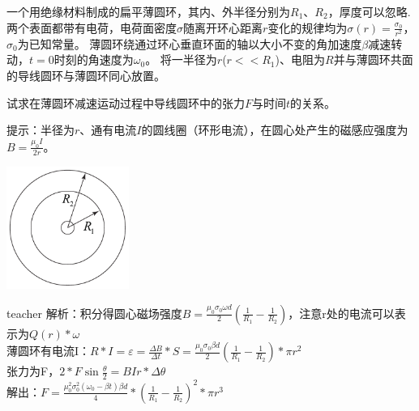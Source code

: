 \begin{example}
一个用绝缘材料制成的扁平薄圆环，其内、外半径分别为$R_1$、$R_2$，厚度可以忽略.
两个表面都带有电荷，电荷面密度$\sigma$随离开环心距离$r$变化的规律均为$ \sigma(r) = \frac{\sigma_0}{r^2}$，$\sigma_0$为已知常量。
薄圆环绕通过环心垂直环面的轴以大小不变的角加速度$\beta$减速转动，$t = 0$时刻的角速度为$\omega_0$。
将一半径为$r$($r<<R_1$)、电阻为$R$并与薄圆环共面的导线圆环与薄圆环同心放置。

试求在薄圆环减速运动过程中导线圆环中的张力$F$与时间$t$的关系。

提示：半径为$r$、通有电流$I$的圆线圈（环形电流），在圆心处产生的磁感应强度为$B = \frac{\mu_0I}{2r}$。
\begin{flushright}
\includegraphics[width = 0.3\textwidth]{images/mag-35.pdf} 
\end{flushright}


\begin{taggedblock}{teacher}
\noindent
解析：积分得圆心磁场强度$B=\frac{\mu_0 \sigma_0\omega d}{2}(\frac{1}{R_1}-\frac{1}{R_2})$，注意r处的电流可以表示为$Q(r)*\omega$
\\薄圆环有电流I：$R*I=\varepsilon=\frac{\Delta B}{\Delta t}*S=\frac{\mu_0 \sigma_0\beta d}{2}(\frac{1}{R_1}-\frac{1}{R_2})*\pi r^2$
\\张力为F，$2*F\sin\frac{\theta}{2}=BIr*\Delta\theta$
\\解出：$F=\frac{\mu_0^2 \sigma_0^2(\omega_0-\beta t)\beta d}{4}*(\frac{1}{R_1}-\frac{1}{R_2})^2*\pi r^3$
\end{taggedblock}
\end{example}

